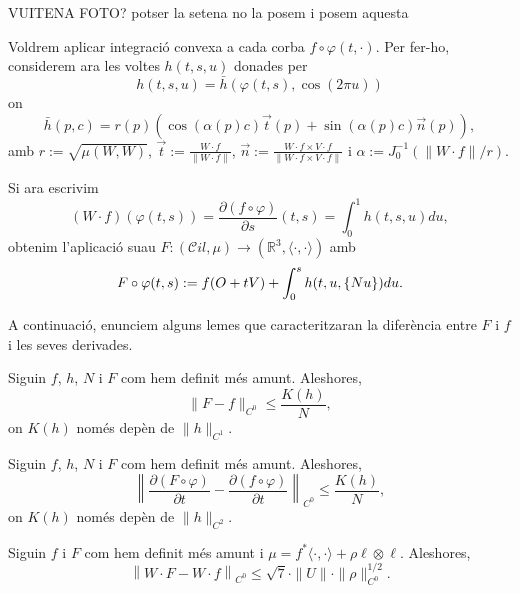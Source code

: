 {\color{blue} VUITENA FOTO? potser la setena no la posem i posem aquesta}

Voldrem aplicar integració convexa a cada corba $f\circ\varphi(t,\cdot)$. Per fer-ho, considerem ara les voltes $h(t,s,u)$ donades per
\begin{equation}
    h(t,s,u) = \bar h(\varphi(t,s), \cos(2\pi u))
\end{equation}
on 
\begin{equation*}
    \bar h(p, c) = r(p)\left( \cos(\alpha(p)c)\vec t(p) + \sin(\alpha(p)c)\vec n(p) \right),
\end{equation*}
amb $r:=\sqrt{\mu(W,W)}$, $\vec t := \frac{W\cdot f}{\|W\cdot f\|}$, $\vec n := \frac{W\cdot f\times V\cdot f}{\|W\cdot f\times V\cdot f\|}$ i $\alpha:= J_0^{-1}(\|W\cdot f\|/r)$.

Si ara escrivim 
\begin{equation*}
    (W\cdot f)(\varphi(t,s)) = \frac{\partial(f\circ\varphi)}{\partial s}(t,s)= \int_0^1 h(t,s,u) du,
\end{equation*}
obtenim l'aplicació suau $F:(\mathcal Cil, \mu)\to(\mathbb R^3, \langle\cdot, \cdot\rangle)$ amb
\begin{equation}
    F\circ\varphi(t,s) := f(O+tV) + \int_0^s h(t,u,\{Nu\}) du.
\end{equation}

A continuació, enunciem alguns lemes que caracteritzaran la diferència entre $F$ i $f$ i les seves derivades.

\begin{lema}
    \label{lema:lema2}
    Siguin $f$, $h$, $N$ i $F$ com hem definit més amunt. Aleshores,
    \begin{equation*}
        \|F-f\|_{C^0} \le \frac{K(h)}{N},
    \end{equation*}
    on $K(h)$ només depèn de $\|h\|_{C^1}$.
\end{lema}

\begin{lema}
    \label{lema:lema3}
    Siguin $f$, $h$, $N$ i $F$ com hem definit més amunt. Aleshores,
    \begin{equation*}
        \left\|\frac{\partial (F\circ \varphi)}{\partial t}-\frac{\partial (f\circ \varphi)}{\partial t}\right\|_{C^0} \le \frac{K(h)}{N},
    \end{equation*}
    on $K(h)$ només depèn de $\|h\|_{C^2}$.
\end{lema}

\begin{lema}
    \label{lema:lema4}
    Siguin $f$ i $F$ com hem definit més amunt i $\mu = f^*\langle\cdot, \cdot\rangle + \rho\ell\otimes\ell$. Aleshores,
    \begin{equation*}
        \left\|W\cdot F-W\cdot f\right\|_{C^0} \le \sqrt7\cdot\|U\|\cdot\|\rho\|^{1/2}_{C^0}.
    \end{equation*}
\end{lema}

